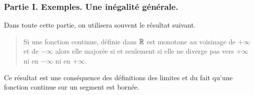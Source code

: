
\subsubsection*{Partie I. Exemples. Une inégalité générale.}

Dans toute cette partie, on utilisera souvent le r\'{e}sultat suivant.

\begin{quote}
Si une fonction continue, d\'{e}finie dans $\mathbb{R}$ est monotone au
voisinage de $+\infty $ et de $-\infty $ alors elle major\'{e}e si et
seulement si elle ne diverge pas vers $+\infty$ ni en $-\infty $ ni en $+\infty $.
\end{quote}

Ce r\'{e}sultat est une cons\'{e}quence des d\'{e}finitions des limites et
du fait qu'une fonction continue sur un segment est born\'{e}e$.$

